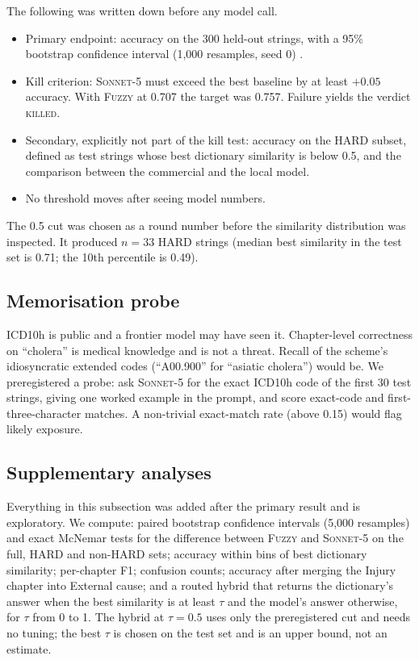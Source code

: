 \documentclass[11pt]{article}
\newcommand{\Bfuzzy}{\textsc{Fuzzy}}
\newcommand{\Mcomm}{\textsc{Sonnet-5}}
\begin{document}
The following was written down before any model call.
\begin{itemize}
  \item Primary endpoint: accuracy on the 300 held-out strings, with a 95\% bootstrap confidence interval (1,000 resamples, seed 0) \citep{efron1993bootstrap}.
  \item Kill criterion: \Mcomm{} must exceed the best baseline by at least $+0.05$ accuracy. With \Bfuzzy{} at 0.707 the target was 0.757. Failure yields the verdict \textsc{killed}.
  \item Secondary, explicitly not part of the kill test: accuracy on the HARD subset, defined as test strings whose best dictionary similarity is below 0.5, and the comparison between the commercial and the local model.
  \item No threshold moves after seeing model numbers.
\end{itemize}
The 0.5 cut was chosen as a round number before the similarity distribution was inspected. It produced $n=33$ HARD strings (median best similarity in the test set is 0.71; the 10th percentile is 0.49).

\subsection{Memorisation probe}
\label{sec:probe-method}

ICD10h is public and a frontier model may have seen it. Chapter-level correctness on ``cholera'' is medical knowledge and is not a threat. Recall of the scheme's idiosyncratic extended codes (``A00.900'' for ``asiatic cholera'') would be. We preregistered a probe: ask \Mcomm{} for the exact ICD10h code of the first 30 test strings, giving one worked example in the prompt, and score exact-code and first-three-character matches. A non-trivial exact-match rate (above 0.15) would flag likely exposure.

\subsection{Supplementary analyses}

Everything in this subsection was added after the primary result and is exploratory. We compute: paired bootstrap confidence intervals (5,000 resamples) and exact McNemar tests \citep{mcnemar1947} for the difference between \Bfuzzy{} and \Mcomm{} on the full, HARD and non-HARD sets; accuracy within bins of best dictionary similarity; per-chapter F1; confusion counts; accuracy after merging the Injury chapter into External cause; and a routed hybrid that returns the dictionary's answer when the best similarity is at least $\tau$ and the model's answer otherwise, for $\tau$ from 0 to 1. The hybrid at $\tau=0.5$ uses only the preregistered cut and needs no tuning; the best $\tau$ is chosen on the test set and is an upper bound, not an estimate.
\end{document}
